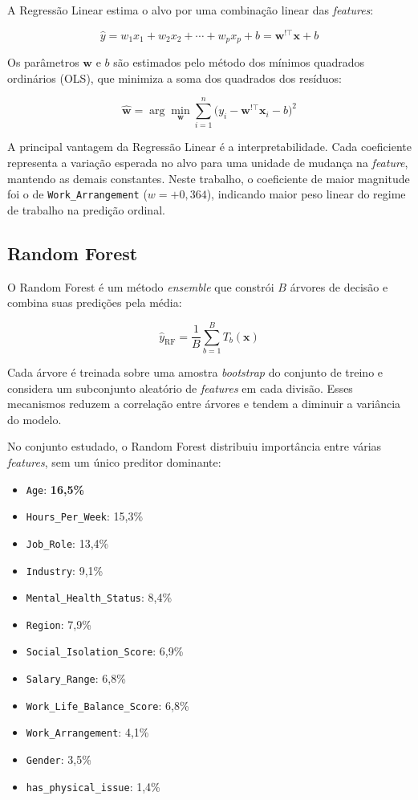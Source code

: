 \documentclass[conference]{IEEEtran}
\begin{document}
A Regressão Linear estima o alvo por uma combinação linear das
\textit{features}:

\begin{equation}
\hat{y} = w_1 x_1 + w_2 x_2 + \cdots + w_p x_p + b
= \mathbf{w}^{!\top}\mathbf{x} + b
\end{equation}

Os parâmetros $\mathbf{w}$ e $b$ são estimados pelo método dos mínimos
quadrados ordinários (OLS), que minimiza a soma dos quadrados dos resíduos:

\begin{equation}
\hat{\mathbf{w}} = \arg\min_{\mathbf{w}}
\sum_{i=1}^{n} \bigl(y_i - \mathbf{w}^{!\top}\mathbf{x}_i - b\bigr)^2
\end{equation}

A principal vantagem da Regressão Linear é a interpretabilidade. Cada
coeficiente representa a variação esperada no alvo para uma unidade de
mudança na \textit{feature}, mantendo as demais constantes. Neste trabalho,
o coeficiente de maior magnitude foi o de \texttt{Work_Arrangement}
($w=+0{,}364$), indicando maior peso linear do regime de trabalho na
predição ordinal.

\subsection{Random Forest}

O Random Forest \cite{breiman2001} é um método \textit{ensemble} que
constrói $B$ árvores de decisão e combina suas predições pela média:

\begin{equation}
\hat{y}_{\text{RF}} = \frac{1}{B} \sum_{b=1}^{B} T_b(\mathbf{x})
\end{equation}

Cada árvore é treinada sobre uma amostra \textit{bootstrap} do conjunto de
treino e considera um subconjunto aleatório de \textit{features} em cada
divisão. Esses mecanismos reduzem a correlação entre árvores e tendem a
diminuir a variância do modelo.

No conjunto estudado, o Random Forest distribuiu importância entre várias
\textit{features}, sem um único preditor dominante:

\begin{itemize}
\item \texttt{Age}: \textbf{16,5\%}
\item \texttt{Hours_Per_Week}: 15,3\%
\item \texttt{Job_Role}: 13,4\%
\item \texttt{Industry}: 9,1\%
\item \texttt{Mental_Health_Status}: 8,4\%
\item \texttt{Region}: 7,9\%
\item \texttt{Social_Isolation_Score}: 6,9\%
\item \texttt{Salary_Range}: 6,8\%
\item \texttt{Work_Life_Balance_Score}: 6,8\%
\item \texttt{Work_Arrangement}: 4,1\%
\item \texttt{Gender}: 3,5\%
\item \texttt{has_physical_issue}: 1,4\%
\end{itemize}
\end{document}
